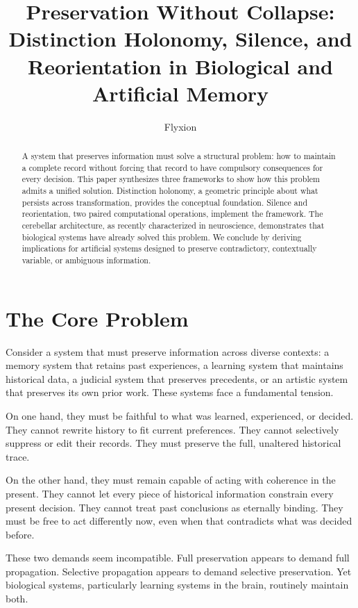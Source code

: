 \documentclass[12pt]{article}
\title{Preservation Without Collapse: \\Distinction Holonomy, Silence, and Reorientation in Biological and Artificial Memory}
\author{Flyxion}
\date{}
\begin{document}
\maketitle

\begin{abstract}

A system that preserves information must solve a structural problem: how to maintain a complete record without forcing that record to have compulsory consequences for every decision. This paper synthesizes three frameworks to show how this problem admits a unified solution. Distinction holonomy, a geometric principle about what persists across transformation, provides the conceptual foundation. Silence and reorientation, two paired computational operations, implement the framework. The cerebellar architecture, as recently characterized in neuroscience, demonstrates that biological systems have already solved this problem. We conclude by deriving implications for artificial systems designed to preserve contradictory, contextually variable, or ambiguous information.

\end{abstract}

\section{The Core Problem}

Consider a system that must preserve information across diverse contexts: a memory system that retains past experiences, a learning system that maintains historical data, a judicial system that preserves precedents, or an artistic system that preserves its own prior work. These systems face a fundamental tension.

On one hand, they must be faithful to what was learned, experienced, or decided. They cannot rewrite history to fit current preferences. They cannot selectively suppress or edit their records. They must preserve the full, unaltered historical trace.

On the other hand, they must remain capable of acting with coherence in the present. They cannot let every piece of historical information constrain every present decision. They cannot treat past conclusions as eternally binding. They must be free to act differently now, even when that contradicts what was decided before.

These two demands seem incompatible. Full preservation appears to demand full propagation. Selective propagation appears to demand selective preservation. Yet biological systems, particularly learning systems in the brain, routinely maintain both.
\end{document}
